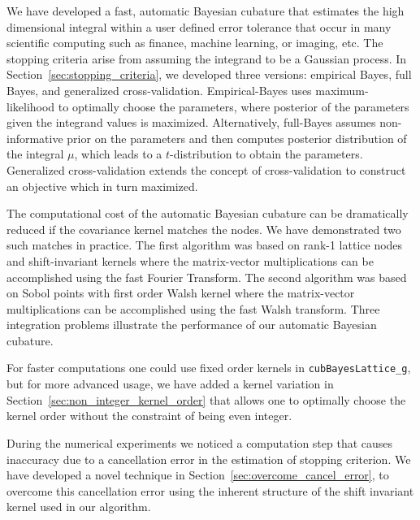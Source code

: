 \documentclass{iitthesis}          %
\newcommand{\code}[1]{\texttt{#1}}
\newcommand\secref{Section~\ref}
\begin{document}
{{{{{{\fi








We have developed a fast, automatic Bayesian cubature that estimates the high dimensional integral within a user defined error tolerance  that occur in many scientific computing such as finance, machine learning, or imaging, etc.  The stopping criteria arise from assuming the integrand to be a Gaussian process.  In \secref{sec:stopping_criteria}, we developed three versions:  empirical Bayes, full Bayes, and generalized cross-validation.  Empirical-Bayes uses maximum-likelihood to optimally choose the parameters, where posterior of the parameters given the integrand values is maximized. Alternatively, full-Bayes assumes non-informative prior on the parameters and then computes posterior distribution of the integral $\mu$, which leads to a $t$-distribution to obtain the parameters. Generalized cross-validation extends the concept of cross-validation to construct an objective which in turn maximized.

The computational cost of the automatic Bayesian cubature can be dramatically reduced if the covariance kernel matches the nodes.  We have demonstrated two such matches in practice. The first algorithm was based on rank-1 lattice nodes and shift-invariant kernels where the matrix-vector multiplications can be accomplished using the fast Fourier Transform.  The second algorithm was based on Sobol points with first order Walsh kernel where the matrix-vector multiplications can be accomplished using the fast Walsh transform. Three integration problems illustrate the performance of our automatic Bayesian cubature.  

For faster computations one could use fixed order kernels in \code{cubBayesLattice\_g}, but for more advanced usage, we have added a kernel variation in \secref{sec:non_integer_kernel_order} that allows one to optimally choose the kernel order without the constraint of being even integer.

During the numerical experiments we noticed a computation step that causes inaccuracy due to a cancellation error in the estimation of stopping criterion.
We have developed a novel technique in \secref{sec:overcome_cancel_error}, to overcome this cancellation error using the inherent structure of the shift invariant kernel used in our algorithm.

}}}}}}
\end{document}
